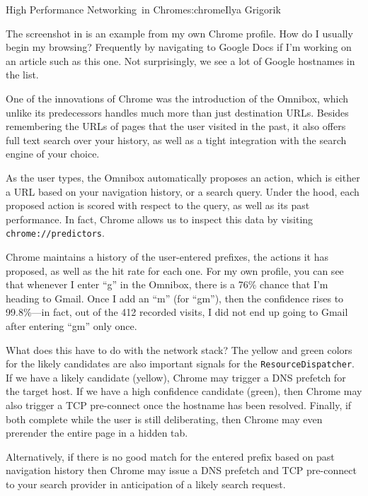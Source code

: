 \begin{aosachapter}{High Performance Networking~in Chrome}{s:chrome}{Ilya Grigorik}

The screenshot in  is an example from
my own Chrome profile. How do I usually begin my browsing? Frequently by
navigating to Google Docs if I'm working on an article such as this one.
Not surprisingly, we see a lot of Google hostnames in the list.


One of the innovations of Chrome was the introduction of the Omnibox,
which unlike its predecessors handles much more than just destination
URLs. Besides remembering the URLs of pages that the user visited in the
past, it also offers full text search over your history, as well as a
tight integration with the search engine of your choice.

As the user types, the Omnibox automatically proposes an action, which
is either a URL based on your navigation history, or a search query.
Under the hood, each proposed action is scored with respect to the
query, as well as its past performance. In fact, Chrome allows us to
inspect this data by visiting \texttt{chrome://predictors}.


Chrome maintains a history of the user-entered prefixes, the actions it
has proposed, as well as the hit rate for each one. For my own profile,
you can see that whenever I enter ``g'' in the Omnibox, there is a 76\%
chance that I'm heading to Gmail. Once I add an ``m'' (for ``gm''), then
the confidence rises to 99.8\%---in fact, out of the 412 recorded
visits, I did not end up going to Gmail after entering ``gm'' only once.

What does this have to do with the network stack? The yellow and green
colors for the likely candidates are also important signals for the
\texttt{ResourceDispatcher}. If we have a likely candidate (yellow),
Chrome may trigger a DNS prefetch for the target host. If we have a high
confidence candidate (green), then Chrome may also trigger a TCP
pre-connect once the hostname has been resolved. Finally, if both
complete while the user is still deliberating, then Chrome may even
prerender the entire page in a hidden tab.

Alternatively, if there is no good match for the entered prefix based on
past navigation history then Chrome may issue a DNS prefetch and TCP
pre-connect to your search provider in anticipation of a likely search
request.


\end{aosachapter}
